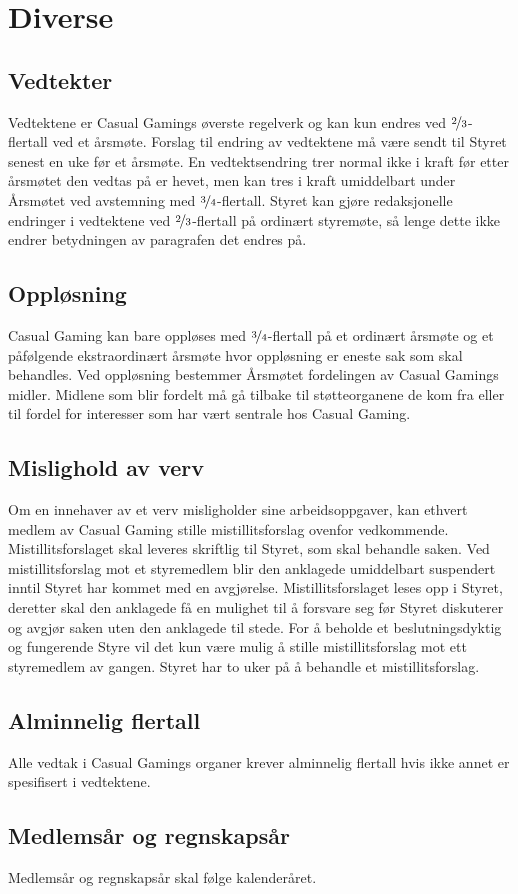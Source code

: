 \chapter{Diverse}

\section{Vedtekter}
Vedtektene er Casual Gamings øverste regelverk og kan kun endres ved $\nicefrac{2}{3}$-flertall ved et årsmøte. Forslag til endring av vedtektene må være sendt til Styret senest en uke før et årsmøte. En vedtektsendring trer normal ikke i kraft før etter årsmøtet den vedtas på er hevet, men kan tres i kraft umiddelbart under Årsmøtet ved avstemning med $\nicefrac{3}{4}$-flertall. Styret kan gjøre redaksjonelle endringer i vedtektene ved $\nicefrac{2}{3}$-flertall på ordinært styremøte, så lenge dette ikke endrer betydningen av paragrafen det endres på.

\section{Oppløsning}
Casual Gaming kan bare oppløses med $\nicefrac{3}{4}$-flertall på et ordinært årsmøte og et påfølgende ekstraordinært årsmøte hvor oppløsning er eneste sak som skal behandles. Ved oppløsning bestemmer Årsmøtet fordelingen av Casual Gamings midler. Midlene som blir fordelt må gå tilbake til støtteorganene de kom fra eller til fordel for interesser som har vært sentrale hos Casual Gaming.

\section{Mislighold av verv}
Om en innehaver av et verv misligholder sine arbeidsoppgaver, kan ethvert medlem av Casual Gaming stille mistillitsforslag ovenfor vedkommende. Mistillitsforslaget skal leveres skriftlig til Styret, som skal behandle saken. Ved mistillitsforslag mot et styremedlem blir den anklagede umiddelbart suspendert inntil Styret har kommet med en avgjørelse. Mistillitsforslaget leses opp i Styret, deretter skal den anklagede få en mulighet til å forsvare seg før Styret diskuterer og avgjør saken uten den anklagede til stede. For å beholde et beslutningsdyktig og fungerende Styre vil det kun være mulig å stille mistillitsforslag mot ett styremedlem av gangen. Styret har to uker på å behandle et mistillitsforslag.

\section{Alminnelig flertall}
Alle vedtak i Casual Gamings organer krever alminnelig flertall hvis ikke annet er spesifisert i vedtektene.

\section{Medlemsår og regnskapsår}
Medlemsår og regnskapsår skal følge kalenderåret.
